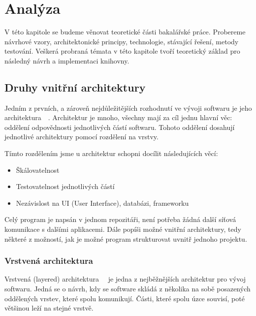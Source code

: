 \chapter{Analýza}

V této kapitole se budeme věnovat teoretické části bakalářské práce. Probereme návrhové vzory, architektonické principy, technologie, stávající řešení, metody testování. Veškerá probraná témata v této kapitole tvoří teoretický základ pro následný návrh a implementaci knihovny.

\section{Druhy vnitřní architektury}
\label{internal architectures}

Jedním z prvních, a zároveň nejdůležitějších rozhodnutí ve vývoji softwaru je jeho architektura~\cite{Architecture}~\cite{Monolitic}. Architektur je mnoho, všechny mají za cíl jednu hlavní věc: oddělení odpovědnosti jednotlivých částí softwaru. Tohoto oddělení dosahují jednotlivé architektury pomocí rozdělení na vrstvy.

Tímto rozdělením jsme u architektur schopni docílit následujících věcí:

\begin{itemize}
    \item Škálovatelnost
    \item Testovatelnost jednotlivých částí
    \item Nezávislost na UI (User Interface), databázi, frameworku
\end{itemize}

Celý program je napsán v jednom repozitáři, není potřeba žádná další síťová komunikace s dalšími aplikacemi. Dále popíši možné vnitřní architektury, tedy některé z možností, jak je možné program strukturovat uvnitř jednoho projektu.

\subsection{Vrstvená architektura}
\label{layered architecture}

Vrstvená (layered) architektura~\cite{Layer1}~\cite{LayeredBook} je jedna z nejběžnějších architektur pro vývoj softwaru.  Jedná se o návrh, kdy se software skládá z několika na sobě posazených oddělených vrstev, které spolu komunikují. Části, které spolu úzce souvisí, poté většinou leží na stejné vrstvě.

